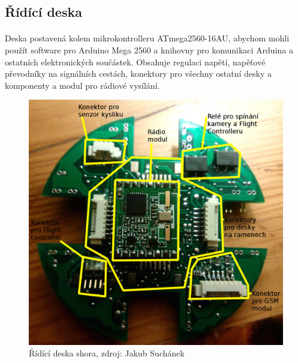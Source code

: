 \documentclass[a4paper]{report}
\begin{document}
\subsection{Řídící deska}
\paragraph{} Deska postavená kolem mikrokontrolleru ATmega2560-16AU, abychom mohli použít software pro Arduino Mega 2560 a knihovny pro komunikaci Arduina a ostatních elektronických součástek. Obsahuje regulaci napětí, napěťové převodníky na signálních cestách, konektory pro všechny ostatní desky a komponenty a modul pro rádiové vysílání.
\begin{figure}[H]
\centering
\caption{Řídící deska shora, zdroj: Jakub Suchánek}
\includegraphics[width=400pt]{main1.jpg}
\end{figure}
\end{document}
